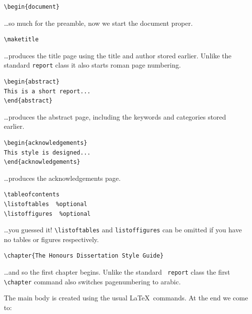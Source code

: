 \documentclass{cshonours}
\begin{document}
\begin{verbatim}
\begin{document}
\end{verbatim}
\ldots so much for the preamble, now we start the document proper.

\begin{verbatim}
\maketitle
\end{verbatim}
\ldots produces the title page using the title and author stored
earlier. Unlike the standard {\tt report} class it also starts roman
page numbering.

\begin{verbatim}
\begin{abstract}
This is a short report...
\end{abstract}
\end{verbatim}
\ldots produces the abstract page, including the keywords and
categories stored earlier.

\begin{verbatim}
\begin{acknowledgements}
This style is designed...
\end{acknowledgements}
\end{verbatim}
\ldots produces the acknowledgements page.

\begin{verbatim}
\tableofcontents
\listoftables  %optional
\listoffigures  %optional
\end{verbatim}
\ldots you guessed it! \verb!\listoftables! and \verb!listoffigures!
can be omitted if you have no tables or figures respectively.

\begin{verbatim}
\chapter{The Honours Dissertation Style Guide}
\end{verbatim}

\ldots and so the first chapter begins. Unlike the standard {\tt
report} class the first \verb!\chapter! command also switches
pagenumbering to arabic.

The main body is created using the usual \LaTeX\ commands. At the end
we come to:
\end{document}
